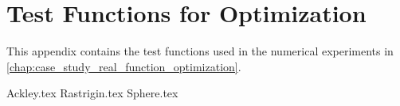 \chapter{Test Functions for Optimization}
\label{chap:test_functions}
  This appendix contains the test functions used in the numerical experiments in 
  \vref{chap:case_study_real_function_optimization}.

  {Ackley.tex}
  {Rastrigin.tex}
  {Sphere.tex}